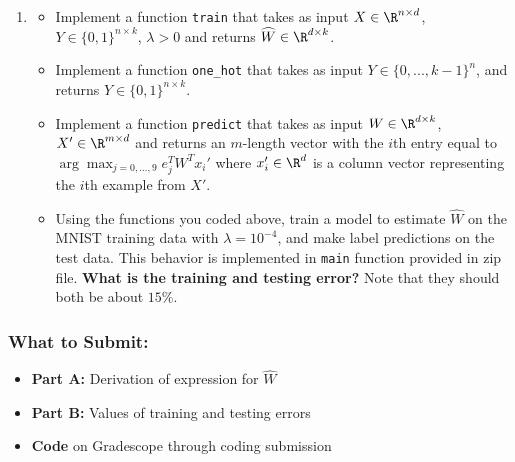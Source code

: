 \documentclass{article}
\begin{document}
\begin{aprob}
\begin{enumerate}
        \item {} 
        \begin{itemize}
            \item Implement a function \verb|train| that takes as input $X \in\R^{n \times d}$, $Y \in \{0,1\}^{n \times k}$, $\lambda > 0$ and returns $\widehat{W} \in \R^{d \times k}$.
            \item Implement a function \verb|one_hot| that takes as input $Y \in \{0, ..., k-1\}^{n}$, and returns $Y \in \{0,1\}^{n \times k}$.
            \item Implement a function  \verb|predict| that takes as input $W \in \R^{d \times k}$, $X' \in\R^{m \times d}$ and returns an $m$-length vector with the $i$th entry equal to $\arg\max_{j=0,\dots,9} e_j^T W^T x_i'$ where $x_i' \in \R^d$ is a column vector representing the $i$th example from $X'$.
            \item Using the functions you coded above, train a model to estimate $\widehat{W}$ on the MNIST training data with $\lambda = 10^{-4}$, and make label predictions on the test data. This behavior is implemented in \verb|main| function provided in zip file. {\bf What is the training and testing error?} Note that they should both be about $15\%$. 
        \end{itemize}
    \end{enumerate}
    
    \subsubsection*{What to Submit:}
    \begin{itemize}
        \item \textbf{Part A:} Derivation of expression for $\widehat{W}$
        \item \textbf{Part B:} Values of training and testing errors
        \item \textbf{Code} on Gradescope through coding submission
    \end{itemize}
\end{aprob}
\end{document}
